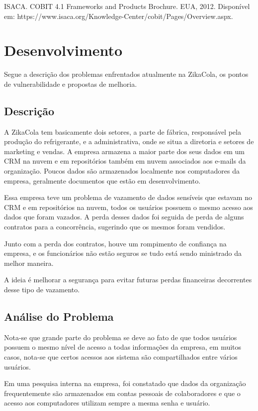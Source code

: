 \documentclass[12pt]{article}
\begin{document}
ISACA. COBIT 4.1 Frameworks and Products Brochure. EUA, 2012. Disponível em:
https://www.isaca.org/Knowledge-Center/cobit/Pages/Overview.aspx. 

\section{Desenvolvimento}

Segue a descrição dos problemas enfrentados atualmente na ZikaCola, os pontos de vulnerabilidade e propostas de melhoria.

\subsection{Descrição}

A ZikaCola tem basicamente dois setores, a parte de fábrica, responsável pela produção do refrigerante, e a administrativa, onde se situa a diretoria e setores de marketing e vendas. A empresa armazena a maior parte dos seus dados em um CRM na nuvem e em repositórios também em nuvem associados aos e-mails da organização. Poucos dados são armazenados localmente nos computadores da empresa, geralmente documentos que estão em desenvolvimento.

Essa empresa teve um problema de vazamento de dados sensíveis que estavam no CRM e em repositórios na nuvem, todos os usuários possuem o mesmo acesso aos dados que foram vazados. A perda desses dados foi seguida de perda de alguns contratos para a concorrência, sugerindo que os mesmos foram vendidos.

Junto com a perda dos contratos, houve um rompimento de confiança na empresa, e os funcionários não estão seguros se tudo está sendo ministrado da melhor maneira.

A ideia é melhorar a segurança para evitar futuras perdas financeiras decorrentes desse tipo de vazamento.

\subsection{Análise do Problema}

Nota-se que grande parte do problema se deve ao fato de que todos usuários possuem o mesmo nível de acesso a todas informações da empresa, em muitos casos, nota-se que certos acessos aos sistema são compartilhados entre vários usuários.

Em uma pesquisa interna na empresa, foi constatado que dados da organização frequentemente são armazenados em contas pessoais de colaboradores e que o acesso aos computadores utilizam sempre a mesma senha e usuário.
\end{document}

